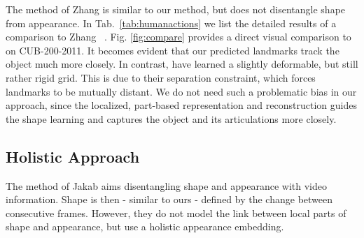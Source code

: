 			The method of Zhang \etal \cite{zhang18} is similar to our method, but does not disentangle shape from appearance.
			In Tab.~\ref{tab:humanactions} we list the detailed results of a comparison to Zhang \etal~\cite{zhang18}.
			Fig. \ref{fig:compare} provides a direct visual comparison to \cite{zhang18} on CUB-200-2011.
			It becomes evident that our predicted landmarks track the object much more closely.
			In contrast, \cite{zhang18} have learned a slightly deformable, but still rather rigid grid.
			This is due to their separation constraint, which forces landmarks to be mutually distant.
			We do not need such a problematic bias in our approach, since the localized, part-based representation and reconstruction guides the shape learning and captures the object and its articulations more closely.

		\subsection{Holistic Approach}\label{sec:jakab}
			The method of Jakab \etal \cite{jakab18} aims disentangling shape and appearance with video information. Shape is then - similar to ours - defined by the change between consecutive frames. However, they do not model the link between local parts of shape and appearance, but use a holistic appearance embedding.

